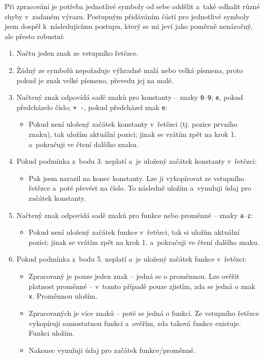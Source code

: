 \documentclass[pdftex,a4paper]{article}
\begin{document}
Při zpracování je potřeba jednotlivé symboly od sebe oddělit a~také odhalit různé chyby v~zadaném výrazu. Postupným přidáváním částí pro jednotlivé symboly jsem dospěl k~následujícímu postupu, který se mi jeví jako poměrně nenáročný, ale přesto robustní:

\begin{enumerate}
\item Načtu jeden znak ze vstupního řetězce.
\item Žádný ze symbolů nepožaduje výhradně malá nebo velká písmena, proto pokud je znak velké písmeno, převedu jej na malé.

\item Načtený znak odpovídá sadě znaků pro konstanty -- znaky \texttt{0}--\texttt{9}; \texttt{e}, pokud předcházelo číslo; \texttt{+ -}, pokud předcházel znak \texttt{e}:
\begin{itemize}
\item Pokud není uložený začátek konstanty v~řetězci (tj. pozice prvního znaku), tak uložím aktuální pozici; jinak se vrátím zpět na krok 1. a~pokračuji ve čtení dalšího znaku.
\end{itemize}
\item Pokud podmínka z~bodu 3. neplatí a~je uložený začátek konstanty v~řetězci: 
\begin{itemize}
\item Pak jsem narazil na konec konstanty. Lze ji vykopírovat ze vstupního řetězce a~poté převést na číslo. To následně uložím a~vynuluji údaj pro začátek konstanty.
\end{itemize}

\item Načtený znak odpovídá sadě znaků pro funkce nebo proměnné -- znaky \texttt{a}--\texttt{z}:
\begin{itemize}
\item Pokud není uložený začátek funkce v~řetězci, tak si uložím aktuální pozici; jinak se vrátím zpět na krok 1. a~pokračuji ve čtení dalšího znaku.
\end{itemize}
\item Pokud podmínka z~bodu 5. neplatí a~je uložený začátek funkce v~řetězci:
\begin{itemize}
\item Zpracovaný je pouze jeden znak -- jedná se o proměnnou. Lze ověřit platnost proměnné -- v~tomto případě pouze zjistím, zda se jedná o znak \texttt{x}. Proměnnou uložím.
\item Zpracovaných je více znaků -- poté se jedná o funkci. Ze vstupního řetězce vykopíruji samostatnou funkci a~ověřím, zda taková funkce existuje. Funkci uložím.
\item Nakonec vynuluji údaj pro začátek funkce/proměnné.
\end{itemize}


\end{enumerate}
\end{document}

